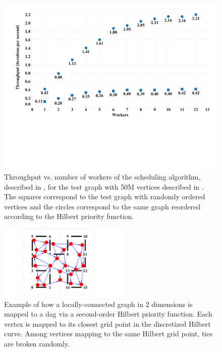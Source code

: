 \begin{figure}[h]
\centering
\includegraphics[width=5in,clip,trim=1cm 6cm 0 0]{figures/scalability_bsp.pdf}
\caption{Throughput vs. number of workers of the  
scheduling algorithm, described in , 
for the test graph with 50M vertices described 
in .  The squares correspond to the test graph 
with randomly ordered vertices and the circles correspond to the same
graph reordered according to the Hilbert priority function.
}
\label{fig:scalability_bsp}
\end{figure}



\begin{figure}
\centering
\includegraphics[width=2.5in,clip,trim=4cm 0 4cm 0]{figures/hilbert_priority_function.pdf}
\caption{Example of how a locally-connected graph in 2 dimensions
is mapped to a dag via a second-order Hilbert priority function.  Each
vertex is mapped to its closest grid point in the discretized
Hilbert curve.  Among vertices mapping to the same Hilbert grid
point, ties are broken randomly.}
\label{fig:hilbert_priority}
\end{figure}


